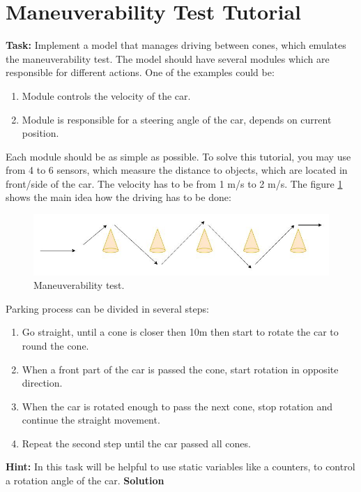\section{Maneuverability Test Tutorial}
\textbf{Task:} Implement a model that manages driving between cones, which emulates the maneuverability test. The model should have several modules which are responsible for different actions. One of the examples could be:
\begin{enumerate}
    \item Module controls the velocity of the car.
    \item Module is responsible for a steering angle of the car, depends on current position.
\end{enumerate}
Each module should be as simple as possible.
To solve this tutorial, you may use from 4 to 6 sensors, which measure the distance to objects, which are located in front/side of the car. The velocity has to be from 1 m/s to 2 m/s. The figure \ref{fig:maneuverability} shows the main idea how the driving has to be done:
\begin{figure}[h!]
    \centering
    \includegraphics[width=\linewidth]{src/pic/drive_cones}
    \caption{Maneuverability test.}
    \label{fig:maneuverability}
\end{figure} \newpage
Parking process can be divided in several steps:
\begin{enumerate}
    \item Go straight, until a cone is closer then 10m then start to rotate the car to round the cone.
    \item When a front part of the car is passed the cone, start rotation in opposite direction.
    \item When the car is rotated enough to pass the next cone, stop rotation and continue the straight movement.
    \item Repeat the second step until the car passed all cones.
\end{enumerate}
\textbf{Hint:} In this task will be helpful to use static variables like a counters, to control a rotation angle of the car. \newline \newline
\textbf{Solution} \newline \newline
